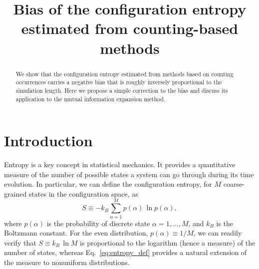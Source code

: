 \documentclass[reprint, superscriptaddress]{revtex4-1}
\begin{document}
\title{Bias of the configuration entropy estimated from counting-based methods}


\begin{abstract}
We show that the configuration entropy estimated from methods based on counting occurrences
carries a negative bias
that is roughly inversely proportional to the simulation length.
%
Here we propose a simple correction to the bias
and discuss its application to the mutual information expansion method.
\end{abstract}

\maketitle


\section{Introduction}

Entropy is a key concept in statistical mechanics.
%
It provides a quantitative measure of
the number of possible states a system can go through during its time evolution.
%
In particular, we can define the configuration entropy,
for $M$ coarse-grained states in the configuration space, as
%
\begin{equation}
  S
  \equiv
  -k_B \sum_{\alpha = 1}^M p(\alpha) \, \ln p(\alpha)
  ,
  \label{eq:entropy_def}
\end{equation}
%
where $p(\alpha)$ is the probability of discrete state $\alpha = 1, \dots, M$,
and $k_B$ is the Boltzmann constant.
%
For the even distribution, $p(\alpha) \equiv 1/M$,
we can readily verify that $S \equiv k_B \, \ln M$
is proportional to the logarithm (hence a measure) of the number of states,
whereas Eq.~\eqref{eq:entropy_def}
provides a natural extension of the measure to nonuniform distributions.
\end{document}
